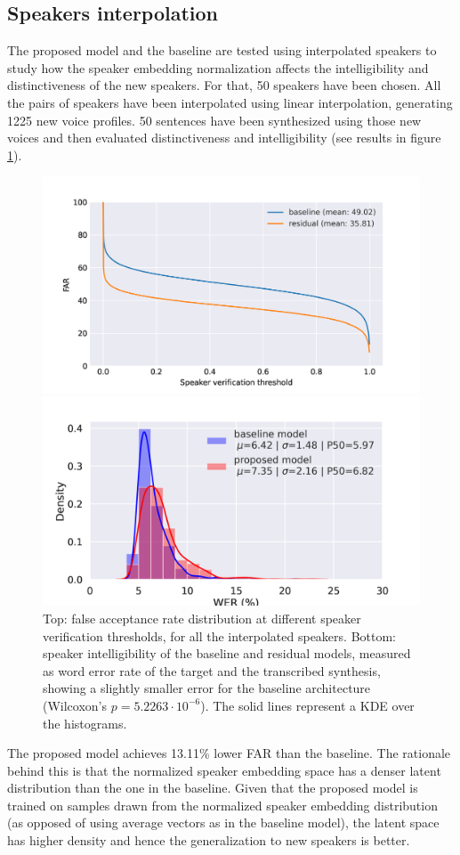 \subsection{Speakers interpolation}
The proposed model and the baseline are tested using interpolated speakers to study how the speaker embedding normalization affects the intelligibility and distinctiveness of the new speakers. For that, 50 speakers have been chosen. All the pairs of speakers have been interpolated using linear interpolation, generating 1225 new voice profiles. 50 sentences have been synthesized using those new voices and then evaluated distinctiveness and intelligibility (see results in figure  \ref{fig:svps}).
\begin{figure}[h!]
	\centering
	\includegraphics[width=0.7\linewidth]{tts/images/far_svps}


	\includegraphics[width=0.7\linewidth]{tts/images/wer_svps}
	\caption{Top: false acceptance rate distribution at different speaker verification thresholds, for all the interpolated speakers. Bottom: speaker intelligibility of the baseline and residual models, measured as word error rate of the target and the transcribed synthesis, showing a slightly smaller error for the baseline architecture (Wilcoxon's $p=5.2263\cdot 10^{-6}$). The solid lines represent a KDE over the histograms.}
	\label{fig:svps}
\end{figure}

The proposed model achieves 13.11\% lower FAR than the baseline. The rationale behind this is that the normalized speaker embedding space has a denser latent distribution than the one in the baseline. Given that the proposed model is trained on samples drawn from the normalized speaker embedding distribution (as opposed of using average vectors as in the baseline model), the latent space has higher density and hence the generalization to new speakers is better.




